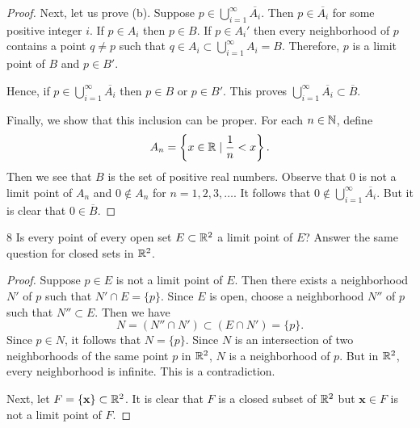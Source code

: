 \begin{proof}
Next, let us prove (b). 
Suppose $p \in \bigcup_{i=1}^{\infty} \overline{A_i}$.
Then $p \in \overline{A_i}$ for some positive integer $i$.
If $p \in A_i$ then $p \in B$.
If $p \in A_i'$ then every neighborhood of $p$ contains a point $q \neq p$ such that $q \in A_i \subset \bigcup_{i=1}^{\infty}A_i=B$.
Therefore, $p$ is a limit point of $B$ and $p \in B'$. 

Hence, if $p \in \bigcup_{i=1}^{\infty} \overline{A_i}$ then $p \in B$ or $p \in B'$. This proves $\bigcup_{i=1}^{\infty}\overline{A_i} \subset \overline{B}$.

Finally, we show that this inclusion can be proper.
For each $n \in \mathbb{N}$, define
\[
A_n=\left\{x \in \mathbb{R} \mid \frac{1}{n}<x \right\}.
\]
Then we see that $B$ is the set of positive real numbers.
Observe that $0$ is not a limit point of $A_n$ and $0 \notin A_n$ for $n=1,2,3, \ldots$.
It follows that $0 \notin \bigcup_{i=1}^{\infty}\overline{A_i}$. But it is clear that $0 \in \overline{B}$.
\end{proof}

\begin{exercise}{8}
Is every point of every open set $E \subset \mathbb{R}^2$ a limit point of $E$?
Answer the same question for closed sets in $\mathbb{R}^2$.
\end{exercise}
\begin{proof}
Suppose $p \in E$ is not a limit point of $E$.
Then there exists a neighborhood $N'$ of $p$ such that $N' \cap E = \{p\}$.
Since $E$ is open, choose a neighborhood $N''$ of $p$ such that $N'' \subset E$.
Then we have 
\[
N= (N'' \cap N') \subset (E \cap N') = \{p\}.
\]
Since $p \in N$, it follows that $N=\{p\}$. Since $N$ is an intersection of two neighborhoods of the same point $p$ in $\mathbb{R}^2$, $N$ is a neighborhood of $p$.
But in $\mathbb{R}^2$, every neighborhood is infinite.
This is a contradiction.

Next, let $F=\{\mathbf{x}\} \subset \mathbb{R}^2$. It is clear that $F$ is a closed subset of $\mathbb{R}^2$ but $\mathbf{x} \in F$ is not a limit point of $F$.
\end{proof}

